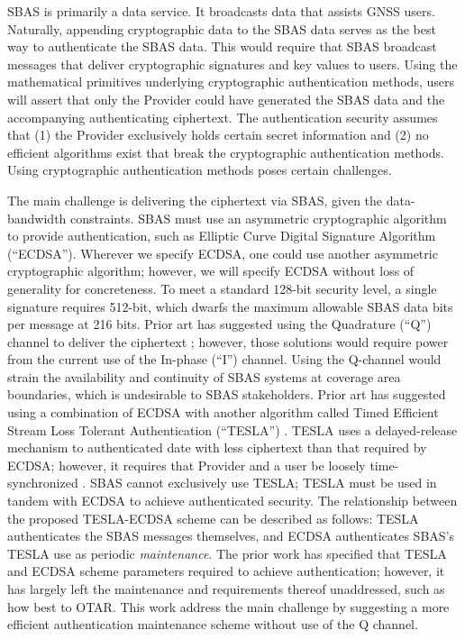 \documentclass[letterpaper,times]{IONconf/IONconf}
\begin{document}
SBAS is primarily a data service.
It broadcasts data that assists GNSS users.
Naturally, appending cryptographic data to the SBAS data serves as the best way to authenticate the SBAS data.
This would require that SBAS broadcast messages that deliver cryptographic signatures and key values to users.
Using the mathematical primitives underlying cryptographic authentication methods, users will assert that only the Provider could have generated the SBAS data and the accompanying authenticating ciphertext.
The authentication security assumes that (1) the Provider exclusively holds certain secret information and (2) no efficient algorithms exist that break the cryptographic authentication methods.
Using cryptographic authentication methods poses certain challenges.

The main challenge is delivering the ciphertext via SBAS, given the data-bandwidth constraints.
SBAS must use an asymmetric cryptographic algorithm to provide authentication, such as Elliptic Curve Digital Signature Algorithm (``ECDSA'').
Wherever we specify ECDSA, one could use another asymmetric cryptographic algorithm; however, we will specify ECDSA without loss of generality for concreteness.
To meet a standard 128-bit security level, a single signature requires 512-bit, which dwarfs the maximum allowable SBAS data bits per message at 216 bits.
Prior art has suggested using the Quadrature (``Q'') channel to deliver the ciphertext \cite{other_schemes}; however, those solutions would require power from the current use of the In-phase (``I'') channel.
Using the Q-channel would strain the availability and continuity of SBAS systems at coverage area boundaries, which is undesirable to SBAS stakeholders.
Prior art has suggested using a combination of ECDSA with another algorithm called Timed Efficient Stream Loss Tolerant Authentication (``TESLA'') \cite{Neish_Dissertation}.
TESLA uses a delayed-release mechanism to authenticated date with less ciphertext than that required by ECDSA; however, it requires that Provider and a user be loosely time-synchronized \cite{perrig2005timed}.
SBAS cannot exclusively use TESLA; TESLA must be used in tandem with ECDSA to achieve authenticated security.
The relationship between the proposed TESLA-ECDSA scheme can be described as follows: TESLA authenticates the SBAS messages themselves, and ECDSA authenticates SBAS's TESLA use as periodic {\em maintenance}.
The prior work has specified that TESLA and ECDSA scheme parameters required to achieve authentication; however, it has largely left the maintenance and requirements thereof unaddressed, such as how best to OTAR.
This work address the main challenge by suggesting a more efficient authentication maintenance scheme without use of the Q channel.
\end{document}
